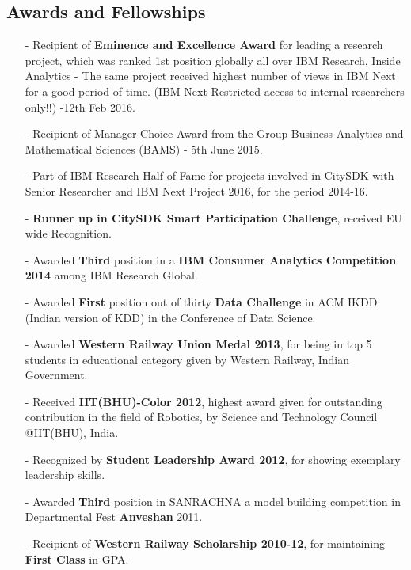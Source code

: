 \documentclass[margin,line]{res}
\begin{document}
\begin{resume}
\section{\sc Awards and Fellowships}
\begin{itemize}
\item[-]Recipient of {\bf Eminence and Excellence Award} for leading a research project, which was ranked 1st position globally all over IBM Research, Inside Analytics - The same project received highest number of views in IBM Next for a good period of time. (IBM Next-Restricted access to internal researchers only!!) -12th Feb 2016.
\item[-]Recipient of Manager Choice Award from the Group Business Analytics and Mathematical Sciences (BAMS) - 5th June 2015.
\item[-]Part of IBM Research Half of Fame for projects involved in CitySDK with Senior Researcher and IBM Next Project 2016, for the period 2014-16.
\item[-]{\bf Runner up in CitySDK Smart Participation Challenge}, received EU wide Recognition.
\item[-]Awarded {\bf Third} position in a {\bf IBM Consumer Analytics Competition 2014} among IBM Research Global.
\item[-]Awarded {\bf First} position out of thirty {\bf Data Challenge} in ACM IKDD (Indian version of KDD) in the Conference of Data Science.
\item[-]Awarded {\bf Western Railway Union Medal 2013}, for being in top 5 students in educational category given by Western Railway, Indian Government.
\item[-]Received {\bf IIT(BHU)-Color 2012}, highest award given for outstanding contribution in the field of Robotics, by Science and Technology Council @IIT(BHU), India. %
\item[-]Recognized by {\bf Student Leadership Award 2012}, for showing exemplary leadership skills. %
\item[-]Awarded {\bf Third} position in SANRACHNA a model building competition in Departmental Fest {\bf Anveshan} 2011.
\item[-]Recipient of {\bf Western Railway Scholarship 2010-12}, for maintaining {\bf First Class} in GPA.
\end{itemize}


\end{resume}
\end{document}

